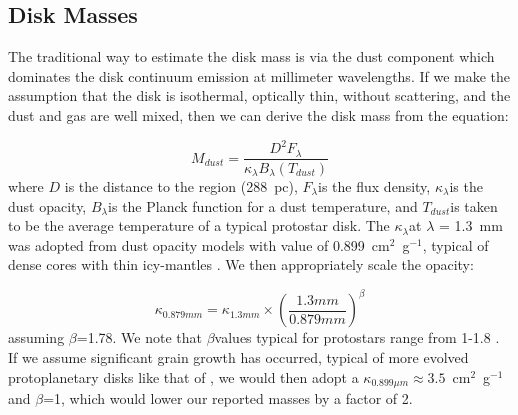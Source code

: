 \subsection{Disk Masses}\label{sec:diskmass}
The traditional way to estimate the disk mass is via the dust component which dominates the disk continuum emission at millimeter wavelengths. If we make the assumption that the disk is isothermal, optically thin, without scattering, and the dust and gas are well mixed, then we can derive the disk mass from the equation:

\begin{equation}\label{eq:dustmasseq}
    M_{dust} = \frac{D^2 F_{\lambda}}{\kappa_{\lambda}B_{\lambda}(T_{dust})}
\end{equation}
where $D$ is the distance to the region (288~pc), $F_{\lambda}$\space is the flux density, $\kappa_{\lambda}$\space is the dust opacity, $B_{\lambda}$\space is the Planck function for a dust temperature, and $T_{dust}$\space is taken to be the average temperature of a typical protostar disk. The $\kappa_{\lambda}$\space at $\lambda$ = 1.3~mm was adopted from dust opacity models with value of 0.899~cm$^2$~g$^{-1}$, typical of dense cores with thin icy-mantles \citep{1994AA...291..943O}. We then appropriately scale the opacity:

\begin{equation}
    \kappa_{0.879 mm} = \kappa_{1.3 mm}\times\left(\frac{1.3 mm}{0.879 mm}\right)^{\beta}
\end{equation}
assuming $\beta$=1.78. We note that $\beta$\space values typical for protostars range from 1-1.8 \citep{2009ApJ...696..841K, 2013PhDT.......434S}. If we assume significant grain growth has occurred, typical of more evolved protoplanetary disks like that of \citet{2009ApJ...700.1502A}, we would then adopt a $\kappa_{0.899\mu m}\approx3.5$~cm$^{2}$~g$^{-1}$\space and $\beta$=1, which would lower our reported masses by a factor of 2.

